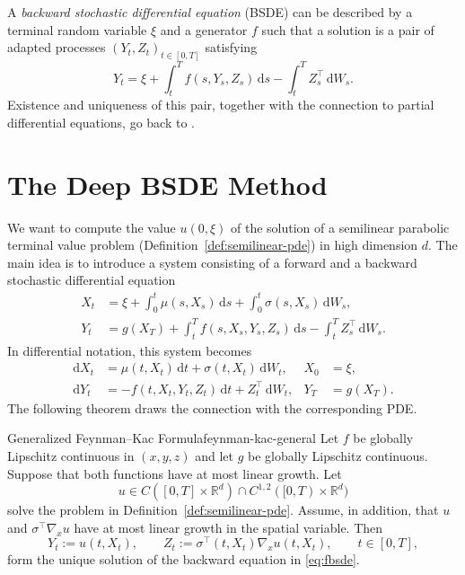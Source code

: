 ﻿\documentclass[10pt,a4paper]{article}
\begin{document}
A\textit{ backward stochastic differential equation} (BSDE) can be described by a terminal random variable $\xi$ and a generator $f$ such that a solution is a pair of adapted processes $(Y_t, Z_t)_{t\in[0,T]}$ satisfying
\[
Y_t = \xi + \int_t^T f(s,Y_s,Z_s)\,\mathrm ds
- \int_t^T Z_s^{\top}\,\mathrm dW_s.
\]
Existence and uniqueness of this pair, together with the connection to partial differential equations, go back to \cite{PardouxPeng1990}.
\section{The Deep BSDE Method}
\label{sec:method}
We want to compute the value $u(0,\xi)$ of the solution of a semilinear
parabolic terminal value problem (Definition~\ref{def:semilinear-pde}) in
high dimension $d$. The main idea is to introduce a system consisting of a forward and a backward stochastic differential equation
\begin{align*}
X_t
&= \xi+\int_0^t\mu(s,X_s)\,\mathrm ds
+\int_0^t\sigma(s,X_s)\,\mathrm dW_s, \\
Y_t
&= g(X_T)+\int_t^T f(s,X_s,Y_s,Z_s)\,\mathrm ds
-\int_t^T Z_s^\top\,\mathrm dW_s.
\end{align*}
In differential notation, this system becomes
\begin{align}
\mathrm dX_t
&=\mu(t,X_t)\,\mathrm dt+\sigma(t,X_t)\,\mathrm dW_t,
& X_0&=\xi, \nonumber\\
\mathrm dY_t
&=-f(t,X_t,Y_t,Z_t)\,\mathrm dt+Z_t^\top\,\mathrm dW_t,
& Y_T&=g(X_T).
\label{eq:fbsde}
\end{align}
The following theorem draws the connection with the corresponding
PDE.
\begin{theorem}[breakable]{Generalized Feynman--Kac Formula}{feynman-kac-general}
Let $f$ be globally Lipschitz continuous in $(x,y,z)$ and let $g$ be
globally Lipschitz continuous. Suppose that both functions have at most
linear growth. Let
\[
u\in C([0,T]\times\mathbb R^d)
\cap C^{1,2}([0,T)\times\mathbb R^d)
\]
solve the problem in Definition~\ref{def:semilinear-pde}. Assume, in
addition, that $u$ and $\sigma^\top\nabla_xu$ have at most linear growth in the spatial variable. Then
\begin{equation}
Y_t:=u(t,X_t),
\qquad
Z_t:=\sigma^\top(t,X_t)\nabla_xu(t,X_t),
\qquad t\in[0,T],
\label{eq:genfeynman}
\end{equation}
form the unique solution of the backward equation in \eqref{eq:fbsde}.
\end{theorem}
\end{document}
